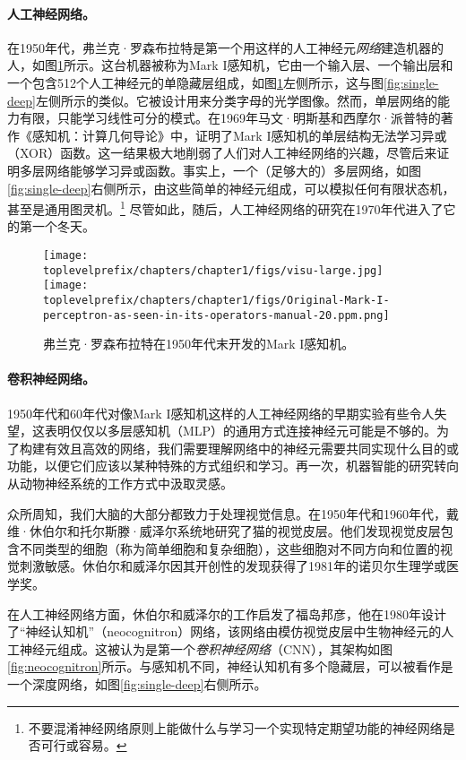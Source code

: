 \documentclass[../../book-main_zh.tex]{subfiles}
\begin{document}
\paragraph{人工神经网络。}
在1950年代，弗兰克·罗森布拉特是第一个用这样的人工神经元{\em 网络}建造机器的人，如图\ref{fig:perceptron}所示。这台机器被称为Mark I感知机，它由一个输入层、一个输出层和一个包含512个人工神经元的单隐藏层组成，如图\ref{fig:perceptron}左侧所示，这与图\ref{fig:single-deep}左侧所示的类似。它被设计用来分类字母的光学图像。然而，单层网络的能力有限，只能学习线性可分的模式。在1969年马文·明斯基和西摩尔·派普特的著作《感知机：计算几何导论》\cite{Minsky-1969}中，证明了Mark I感知机的单层结构无法学习异或（XOR）函数。这一结果极大地削弱了人们对人工神经网络的兴趣，尽管后来证明多层网络能够学习异或函数\cite{Rumelhart1986}。事实上，一个（足够大的）多层网络，如图\ref{fig:single-deep}右侧所示，由这些简单的神经元组成，可以模拟任何有限状态机，甚至是通用图灵机。\footnote{不要混淆神经网络原则上能做什么与学习一个实现特定期望功能的神经网络是否可行或容易。} 尽管如此，随后，人工神经网络的研究在1970年代进入了它的第一个冬天。

\begin{figure}
    \centering
    \texttt{[image: \\toplevelprefix/chapters/chapter1/figs/visu-large.jpg]}
    \hspace{2mm} \texttt{[image: \\toplevelprefix/chapters/chapter1/figs/Original-Mark-I-perceptron-as-seen-in-its-operators-manual-20.ppm.png]}
    \caption{弗兰克·罗森布拉特在1950年代末开发的Mark I感知机。}
    \label{fig:perceptron}
\end{figure}


\paragraph{卷积神经网络。}
1950年代和60年代对像Mark I感知机这样的人工神经网络的早期实验有些令人失望，这表明仅仅以多层感知机（MLP）的通用方式连接神经元可能是不够的。为了构建有效且高效的网络，我们需要理解网络中的神经元需要共同实现什么目的或功能，以便它们应该以某种特殊的方式组织和学习。再一次，机器智能的研究转向从动物神经系统的工作方式中汲取灵感。

众所周知，我们大脑的大部分都致力于处理视觉信息。在1950年代和1960年代，戴维·休伯尔和托尔斯滕·威泽尔系统地研究了猫的视觉皮层。他们发现视觉皮层包含不同类型的细胞（称为简单细胞和复杂细胞），这些细胞对不同方向和位置的视觉刺激敏感\cite{Hubel-Wiesel-1959}。休伯尔和威泽尔因其开创性的发现获得了1981年的诺贝尔生理学或医学奖。


在人工神经网络方面，休伯尔和威泽尔的工作启发了福岛邦彦，他在1980年设计了“神经认知机”（neocognitron）网络，该网络由模仿视觉皮层中生物神经元的人工神经元组成\cite{Fukushima1980NeocognitronAS}。这被认为是第一个{\em 卷积神经网络}（CNN），其架构如图\ref{fig:neocognitron}所示。与感知机不同，神经认知机有多个隐藏层，可以被看作是一个深度网络，如图\ref{fig:single-deep}右侧所示。
\end{document}
